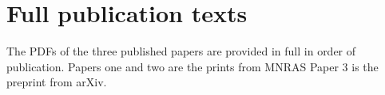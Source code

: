 
\chapter{Full publication texts}
\label{Appx:Papers}

The PDFs of the three published papers are provided in full in order of publication. Papers one \cite{Grylls2019AClusters} and two \cite{Grylls2020PredictingSTEEL} are the prints from MNRAS Paper 3 \cite{Grylls2020TheFractions} is the preprint from arXiv.




